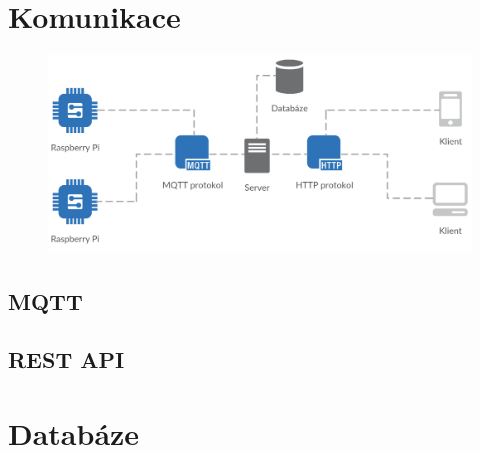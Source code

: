 \documentclass[czech,BP]{thesiskiv}
\begin{document}





		\section{Komunikace}
		
		
\begin{figure}[ht]
   		 	\centering
			\includegraphics[width=1\textwidth]{../diagrams/network.png}	
			\caption{}
    		\label{fig:network}
		\end{figure}
		
		
		
		\subsection{MQTT}
		

	

		
		
		
	
		\subsection{REST API}
		
	
		
	
	\section{Databáze}
	
	
\end{document}
